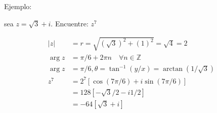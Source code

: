 Ejemplo: 

sea $z=\sqrt{3}+i$. Encuentre: $z^7$

\[
  \begin{aligned}
     |z| & =r=\sqrt{(\sqrt{3})^2+(1)^2}=\sqrt{4}=2 \\
     \arg z & =\pi / 6+2 \pi n \quad \forall n \in \mathbb{Z} \\
     \arg z & =\pi / 6, \theta=\tan ^{-1}(y / x)=\arctan (1 / \sqrt{3}) \\
     z^7 & =2^7[\cos (7 \pi / 6)+i \operatorname{\sin}(7 \pi / 6)] \\
     & =128[-\sqrt{3} / 2-i 1 / 2] \\
     & =-64[\sqrt{3}+i]
  \end{aligned}
\]


